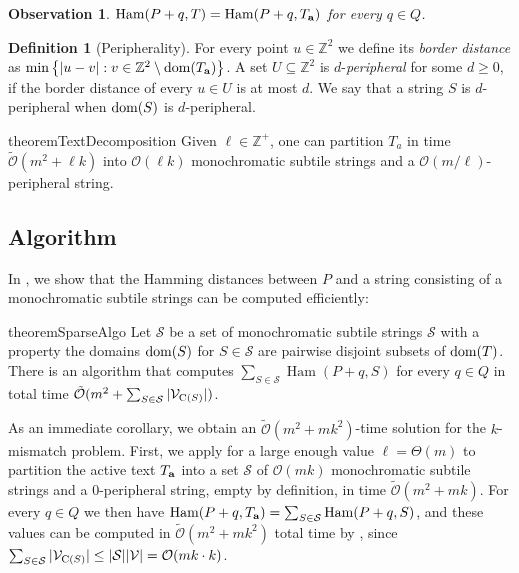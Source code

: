 \documentclass[11pt, letterpaper]{article}
\theoremstyle{plain}
\newtheorem{observation}{Observation}
\theoremstyle{definition}
\newtheorem{definition}{Definition}
\theoremstyle{remark}
\newcommand{\Z}{\mathbb{Z}}
\renewcommand{\O}{\mathcal{O}}
\newcommand{\tO}{\tilde{\mathcal{O}}}
\renewcommand{\S}{\mathcal{S}}
\newcommand{\V}{\mathcal{V}}
\newcommand{\set}[1]{\left\lbrace #1 \right\rbrace}
\DeclareMathOperator*{\Ham}{Ham}
\begin{document}
\begin{observation}\label{obs:active_text}
$\Ham(P + q, T) = \Ham(P + q, \Ta)$ for every $q \in Q$.
\end{observation}

\begin{definition}[Peripherality]
For every point $u \in \Z^2$ we define its \emph{border distance} as $\min\set{|u - v| : v \in \Z^2 \setminus \d{\Ta}}$. A set $U \subseteq \Z^2$ is $d$-\emph{peripheral} for some $d \ge 0$, if the border distance of every $u \in U$ is at most $d$. We say that a string $S$ is $d$-peripheral when $\operatorname*{dom}(S)$ is $d$-peripheral.
\end{definition}

\begin{restatable*}{theorem}{TextDecomposition}\label{text_decomposition}
Given $\ell \in \Z^+$, one can partition $T_a$ in time $\tO(m^2 + \ell k)$ into $\O(\ell k)$ monochromatic subtile strings and a $\O(m / \ell)$-peripheral string.
\end{restatable*}

\subsection{Algorithm}
In , we show that the Hamming distances between $P$ and a string consisting of a monochromatic subtile strings can be computed efficiently: 

\begin{restatable*}{theorem}{SparseAlgo}
\label{th:sparse_algo}
Let $\S$ be a set of monochromatic subtile strings $\S$ with a property the domains $\operatorname*{dom}(S)$ for $S \in \S$ are pairwise disjoint subsets of $\operatorname*{dom}(T)$. There is an algorithm that computes
$\sum_{S \in \S} \Ham(P + q, S)$ for every $q \in Q$ in total time $\tO(m^2 + \sum_{S \in \S} |\V_{\getchar{S}}|)$.
\end{restatable*}

As an immediate corollary, we obtain an $\tO(m^2 + mk^2)$-time solution for the $k$-mismatch problem. First, we apply  for a large enough value $\ell = \Theta(m)$ to partition the active text $T_\mathbf{a}$ into a set $\S$ of $\O(mk)$ monochromatic subtile strings and a $0$-peripheral string, empty by definition, in time $\tO(m^2 + mk)$. For every $q \in Q$ we then have $\Ham(P + q, \Ta) = \sum_{S \in \S} \Ham(P + q, S)$, and these values can be computed in $\tO(m^2 + mk^{2})$ total time by , since $\sum_{S \in \S} |\V_{\getchar{S}}| \le |\S| |\V| = \O(mk \cdot k)$. 
\end{document}
